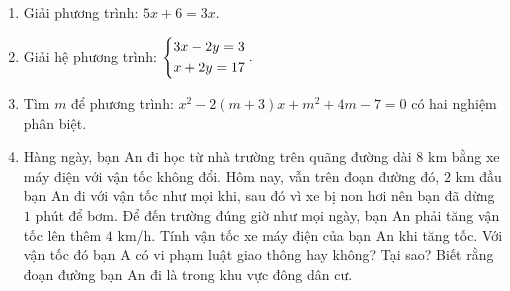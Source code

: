 \begin{ex}%
	\hfill
	\begin{enumerate} 
		\item Giải phương trình: $ 5x+6=3x. $
		\item Giải hệ phương trình: $ \left\{\begin{aligned}3x-2y=3 \\ x+2y=17\end{aligned}\right.. $
		\item Tìm $ m $ để phương trình: $x^2-2(m+3)x+m^2+4m-7=0  $ có hai nghiệm phân biệt.
		\item Hàng ngày, bạn An đi học từ nhà trường trên quãng đường dài $ 8 $ km bằng xe máy điện với vận tốc không đổi. Hôm nay, vẫn trên đoạn đường đó, $ 2 $ km đầu bạn An đi với vận tốc như mọi khi, sau đó vì xe bị non hơi nên bạn đã dừng $ 1 $ phút để bơm. Để đến trường đúng giờ như mọi ngày, bạn An phải tăng vận tốc lên thêm $ 4 $ km/h. Tính vận tốc xe máy điện của bạn An khi tăng tốc. Với vận tốc đó bạn A có vi phạm luật giao thông hay không? Tại sao? Biết rằng đoạn đường bạn An đi là trong khu vực đông dân cư. 
	\end{enumerate}
\end{ex}
